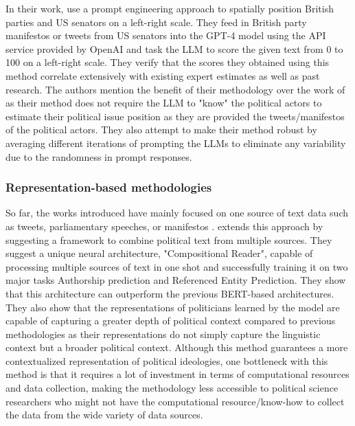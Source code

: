 \documentclass[final,5p,times,twocolumn,authoryear]{elsarticle}
\begin{document}
In their work, \citeauthor{Scaling-Political-Texts-with-ChatGPT} use a prompt engineering approach to spatially position British parties and US senators on a left-right scale. They feed in British party manifestos or tweets from US senators into the GPT-4 model using the API service provided by OpenAI and task the LLM to score the given text from 0 to 100 on a left-right scale. They verify that the scores they obtained using this method correlate extensively with existing expert estimates as well as past research. The authors mention the benefit of their methodology over the work of \citeauthor{llm-latent-position-of-politicians} as their method does not require the LLM to "know" the political actors to estimate their political issue position as they are provided the tweets/manifestos of the political actors. They also attempt to make their method robust by averaging different iterations of prompting the LLMs to eliminate any variability due to the randomness in prompt responses.  

\subsubsection{Representation-based methodologies}
So far, the works introduced have mainly focused on one source of text data such as tweets, parliamentary speeches, or manifestos \citeauthor{Understanding-Politics-via-Contextualized}. extends this approach by suggesting a framework to combine political text from multiple sources. They suggest a unique neural architecture, "Compositional Reader", capable of processing multiple sources of text in one shot and successfully training it on two major tasks Authorship prediction and Referenced Entity Prediction. They show that this architecture can outperform the previous BERT-based architectures. They also show that the representations of politicians learned by the model are capable of capturing a greater depth of political context compared to previous methodologies as their representations do not simply capture the linguistic context but a broader political context. Although this method guarantees a more contextualized representation of political ideologies, one bottleneck with this method is that it requires a lot of investment in terms of computational resources and data collection, making the methodology less accessible to political science researchers who might not have the computational resource/know-how to collect the data from the wide variety of data sources.
\end{document}
